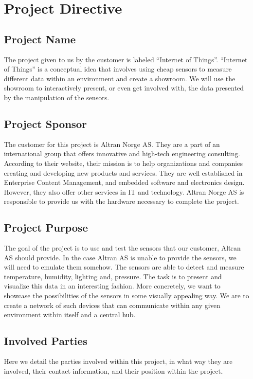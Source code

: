 \documentclass[../document.tex]{subfiles}
\begin{document}
\section{Project Directive}

\subsection{Project Name}
The project given to us by the customer is labeled “Internet of Things”. “Internet of Things” is a conceptual idea that involves using cheap sensors to measure different data within an environment and create a showroom. We will use the showroom to interactively present, or even get involved with, the data presented by the manipulation of the sensors.

\subsection{Project Sponsor}
The customer for this project is Altran Norge AS. They are a part of an international group that offers innovative and high-tech engineering consulting. According to their website, their mission is to help organizations and companies creating and developing new products and services. They are well established in Enterprise Content Management, and embedded software and electronics design. However, they also offer other services in IT and technology. Altran Norge AS is responsible to provide us with the hardware necessary to complete the project.

\subsection{Project Purpose}
The goal of the project is to use and test the sensors that our customer, Altran AS should provide. In the case Altran AS is unable to provide the sensors, we will need to emulate them somehow. The sensors are able to detect and measure temperature, humidity, lighting and, pressure. The task is to present and visualize this data in an interesting fashion. More concretely, we want to showcase the possibilities of the sensors in some visually appealing way. We are to create a network of such devices that can communicate within any given environment within itself and a central hub.

\subsection{Involved Parties}
Here we detail the parties involved within this project, in what way they are involved, their contact information, and their position within the project.
\end{document}
